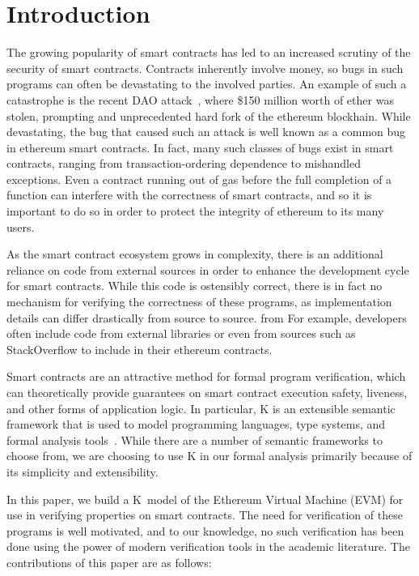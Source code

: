 \section{Introduction}
The growing popularity of smart contracts has led to an increased scrutiny of
the security of smart contracts. Contracts inherently involve money, so bugs in
such programs can often be devastating to the involved parties. An example of
such a catastrophe is the recent DAO attack~\cite{dao-attack}, where \$150
million worth of ether was stolen, prompting and unprecedented hard fork of the
ethereum blockhain. While devastating, the bug that caused such an attack is
well known as a common bug in ethereum smart contracts. In fact, many such
classes of bugs exist in smart contracts, ranging from transaction-ordering
dependence to mishandled exceptions. Even a contract running out of gas before
the full completion of a function can interfere with the correctness of smart
contracts, and so it is important to do so in order to protect the integrity of
ethereum to its many users.

As the smart contract ecosystem grows in complexity, there is an additional
reliance on code from external sources in order to enhance the development cycle
for smart contracts. While this code is ostensibly correct, there is in fact no
mechanism for verifying the correctness of these programs, as implementation
details can differ drastically from source to source. from For example,
developers often include code from external libraries or even from sources such as
StackOverflow to include in their ethereum contracts.

Smart contracts are an attractive method for formal program verification, which
can theoretically provide guarantees on smart contract execution safety,
liveness, and other forms of application logic. In particular, K is an
extensible semantic framework that is used to model programming languages, type
systems, and formal analysis tools~\cite{rosu-serbanuta-2010-jlap}. While there
are a number of semantic frameworks to choose from, we are choosing to use K in
our formal analysis primarily because of its simplicity and extensibility.

In this paper, we build a K~model of the Ethereum Virtual Machine (EVM) for use
in verifying properties on smart contracts. The need for verification of these
programs is well motivated, and to our knowledge, no such verification has been
done using the power of modern verification tools in the academic literature.
The contributions of this paper are as follows:

